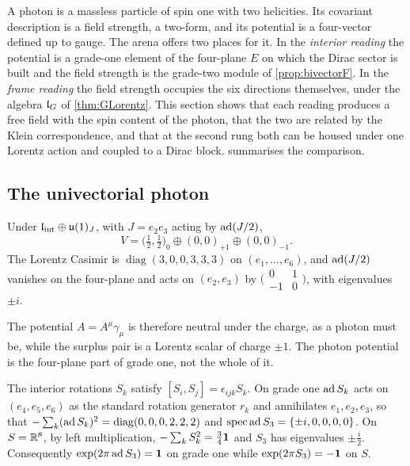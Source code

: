 A photon is a massless particle of spin one with two helicities. Its covariant description is a field strength, a two-form, and
its potential is a four-vector defined up to gauge. The arena offers two places for it. In the \emph{interior reading} the
potential is a grade-one element of the four-plane $E$ on which the Dirac sector is built and the field strength is the grade-two
module of \cref{prop:bivectorF}. In the \emph{frame reading} the field strength occupies the six directions themselves, under the
algebra $\mathfrak l_G$ of \cref{thm:GLorentz}. This section shows that each reading produces a free field with the spin content of the photon,
that the two are related by the Klein correspondence, and that at the second rung both can be housed under one Lorentz action and
coupled to a Dirac block.  summarises the comparison.

\subsection{The univectorial photon}

\begin{proposition}
\label{prop:gradeone}
Under $\mathfrak l_{\rm int}\oplus\mathfrak{u}(1)_J$, with $J=e_2e_3$ acting by $\operatorname{ad}(J/2)$,
\[
V=\bigl(\tfrac12,\tfrac12\bigr)_0\oplus(0,0)_{+1}\oplus(0,0)_{-1}.
\]
The Lorentz Casimir is $\operatorname{diag}(3,0,0,3,3,3)$ on $(e_1,\dots,e_6)$, and $\operatorname{ad}(J/2)$ vanishes on the four-plane and acts on
$(e_2,e_3)$ by $\bigl(\begin{smallmatrix}0&1\\-1&0\end{smallmatrix}\bigr)$, with eigenvalues $\pm i$.
\end{proposition}

The potential $A=A^\mu\gamma_\mu$ is therefore neutral under the charge, as a photon must be, while the surplus pair is a Lorentz
scalar of charge $\pm1$. The photon potential is the four-plane part of grade one, not the whole of it.

\begin{proposition}
\label{prop:samerotors}
The interior rotations $S_k$ satisfy $[S_i,S_j]=\epsilon_{ijk}S_k$. On grade one $\operatorname{ad} S_k$ acts on $(e_4,e_5,e_6)$ as the standard
rotation generator $r_k$ and annihilates $e_1,e_2,e_3$, so that $-\sum_k(\operatorname{ad} S_k)^2=\operatorname{diag}(0,0,0,2,2,2)$ and
$\operatorname{spec}\operatorname{ad} S_3=\{\pm i,0,0,0,0\}$. On $S=\mathbb{R}^8$, by left multiplication, $-\sum_kS_k^2=\tfrac34\mathbf 1$ and $S_3$ has eigenvalues $\pm\tfrac i2$.
Consequently $\exp(2\pi\operatorname{ad} S_3)=\mathbf 1$ on grade one while $\exp(2\pi S_3)=-\mathbf 1$ on $S$.
\end{proposition}

